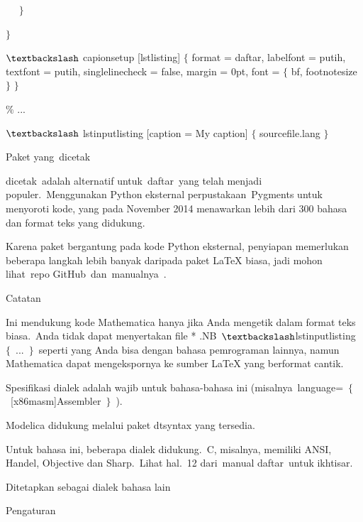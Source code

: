 ~~ $ \} $\par

 $ \} $\par

 $\textbackslash$ capionsetup [lstlisting] $ \{ $ format = daftar, labelfont = putih, textfont = putih, singlelinecheck = false, margin = 0pt, font = $ \{ $ bf, footnotesize $ \} $ $ \} $\par

 $\%$ ...\par

 $\textbackslash$ lstinputlisting [caption = My caption] $ \{ $ sourcefile.lang $ \} $\par

Paket yang dicetak \par

dicetak adalah alternatif untuk daftar yang telah menjadi populer. Menggunakan Python eksternal perpustakaan Pygments untuk menyoroti kode, yang pada November 2014 menawarkan lebih dari 300 bahasa dan format teks yang didukung.\par

Karena paket bergantung pada kode Python eksternal, penyiapan memerlukan beberapa langkah lebih banyak daripada paket LaTeX biasa, jadi mohon lihat repo GitHub dan manualnya .\par

Catatan\par

Ini mendukung kode Mathematica hanya jika Anda mengetik dalam format teks biasa. Anda tidak dapat menyertakan file * .NB $\textbackslash$lstinputlisting $ \{ $ ... $ \} $ seperti yang Anda bisa dengan bahasa pemrograman lainnya, namun Mathematica dapat mengekspornya ke sumber LaTeX yang berformat cantik.\par

Spesifikasi dialek adalah wajib untuk bahasa-bahasa ini (misalnya language= $ \{ $ [x86masm]Assembler $ \} $ ).\par

Modelica didukung melalui paket dtsyntax yang tersedia.\par

Untuk bahasa ini, beberapa dialek didukung. C, misalnya, memiliki ANSI, Handel, Objective dan Sharp. Lihat hal. 12 dari manual daftar untuk ikhtisar.\par

Ditetapkan sebagai dialek bahasa lain\par

Pengaturan \par

